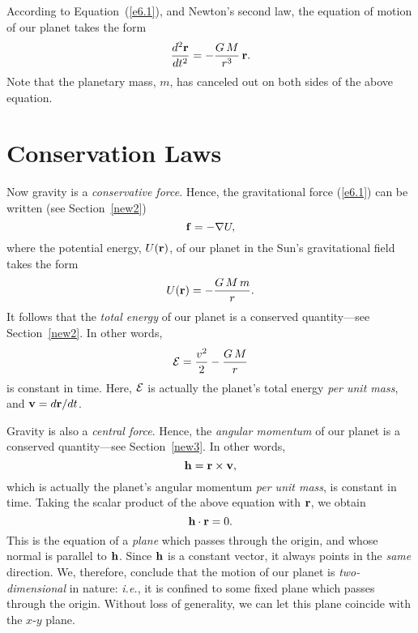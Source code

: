 According to Equation~(\ref{e6.1}), and Newton's second law, the equation
of motion of our planet takes the form
\begin{equation}\label{e6.3}
\frac{d^2{\bf r}}{dt^2} = -\frac{G\,M}{r^3}\,{\bf r}.
\end{equation}
Note that the planetary mass, $m$, has canceled out on both sides of
the above equation.

\section{Conservation Laws}
Now gravity is a {\em conservative force}. Hence, the gravitational force (\ref{e6.1}) can be written (see Section~\ref{new2})
\begin{equation}
{\bf f} = - \nabla U,
\end{equation}
where the potential energy, $U({\bf r})$,  of our planet in the Sun's gravitational field takes the form
\begin{equation}\label{e6.5}
U({\bf r}) = - \frac{G\,M\,m}{r}.
\end{equation}
It follows that the {\em total energy}\/ of our planet is a conserved quantity---see Section~\ref{new2}. In other words,
\begin{equation}\label{e6.6}
{\cal E} = \frac{v^2}{2} - \frac{G\,M}{r}
\end{equation}
is constant in time. Here, ${\cal E}$ is actually the planet's total energy {\em per unit
mass}, and ${\bf v} = d{\bf r}/dt$.

Gravity is also a {\em central force}. Hence, the {\em angular momentum}\/
of our planet is a conserved quantity---see Section~\ref{new3}. In other
words, 
\begin{equation}\label{e6.7}
{\bf h} = {\bf r}\times {\bf v},
\end{equation}
which is actually the planet's angular momentum {\em per unit mass}, is constant
in time. Taking the scalar product of the above equation with ${\bf r}$, we
obtain
\begin{equation}
{\bf h}\cdot{\bf r} = 0.
\end{equation}
This is the equation of a {\em plane}\/ which passes through the origin, and
whose normal is parallel to ${\bf h}$. Since ${\bf h}$  is a constant vector,
it always points in the {\em same}\/ direction. We, therefore, conclude that
the motion of our planet is {\em two-dimensional}\/ in nature: {\em i.e.}, it is confined to some fixed plane which passes through the origin. Without loss of generality, we can let this plane coincide with the $x$-$y$ plane.

